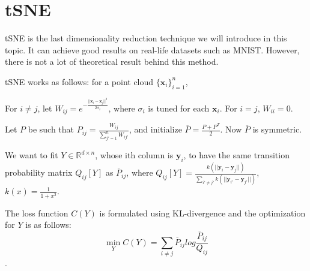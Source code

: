 \documentclass[11pt]{article}
\theoremstyle{definition}
\begin{document}
\section{tSNE}
tSNE is the last dimensionality reduction technique we will introduce in this topic. It can achieve good results on real-life datasets such as MNIST. However, there is not a lot of theoretical result behind this method.

tSNE works as follows: for a point cloud $\{\mathbf{x}_i\}_{i=1}^n$,
\begin{steps}
\item For $i \neq j$, let $W_{ij} = e^{-\frac{||\boldsymbol{x}_i-\boldsymbol{x}_j||^2}{2\sigma_i}}$, where $\sigma_i$ is tuned for each $\boldsymbol{x}_i$. For $i = j$, $W_{ii} = 0$.

Let $P$ be such that $P_{ij} = \frac{W_{ij}}{\sum_{j'=1}^{n}W_{ij'}}$, and initialize $\overline{P} = \frac{P+P^T}{2}$. Now $\overline{P}$ is symmetric.

\item We want to fit $Y \in \mathbb{R}^{d \times n}$, whose ith column is $\boldsymbol{y}_i$, to have the same transition probability matrix $Q_{ij}[Y]$ as $\overline{P}_{ij}$, where $Q_{ij}[Y] = \frac{k(||\boldsymbol{y}_i - \boldsymbol{y}_j||)}{\sum_{i'\neq j'} k(||\boldsymbol{y}_{i'} - \boldsymbol{y}_{j'}||)}$, $k(x) = \frac{1}{1+x^2}$.

The loss function $C(Y)$ is formulated using KL-divergence and the optimization for $Y$ is as follows:
\[\min_{Y}C(Y) = \sum_{i \neq j}\overline{P}_{ij}log\frac{\overline{P}_{ij}}{Q_{ij}}\].
\end{steps}



\end{document}
